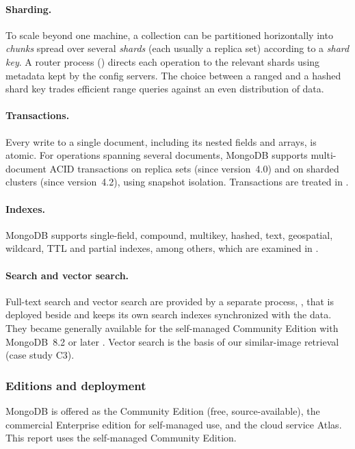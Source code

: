 \paragraph{Sharding.}
To scale beyond one machine, a collection can be partitioned horizontally into \emph{chunks} spread
over several \emph{shards} (each usually a replica set) according to a \emph{shard key}. A router
process () directs each operation to the relevant shards using metadata kept by the
config servers. The choice between a ranged and a hashed shard key trades efficient range queries
against an even distribution of data.

\paragraph{Transactions.}
Every write to a single document, including its nested fields and arrays, is atomic. For
operations spanning several documents, MongoDB supports multi-document ACID transactions on
replica sets (since version~4.0) and on sharded clusters (since version~4.2), using snapshot
isolation. Transactions are treated in .

\paragraph{Indexes.}
MongoDB supports single-field, compound, multikey, hashed, text, geospatial, wildcard, TTL and
partial indexes, among others, which are examined in .

\paragraph{Search and vector search.}
Full-text search and vector search are provided by a separate process, , that is
deployed beside  and keeps its own search indexes synchronized with the data. They
became generally available for the self-managed Community Edition with MongoDB~8.2 or later
\cite{mongodb-search-ga}. Vector search is the basis of our similar-image retrieval (case study
C3).

\subsubsection{Editions and deployment}
MongoDB is offered as the Community Edition (free, source-available), the commercial Enterprise
edition for self-managed use, and the cloud service Atlas. This report uses the self-managed
Community Edition. 

